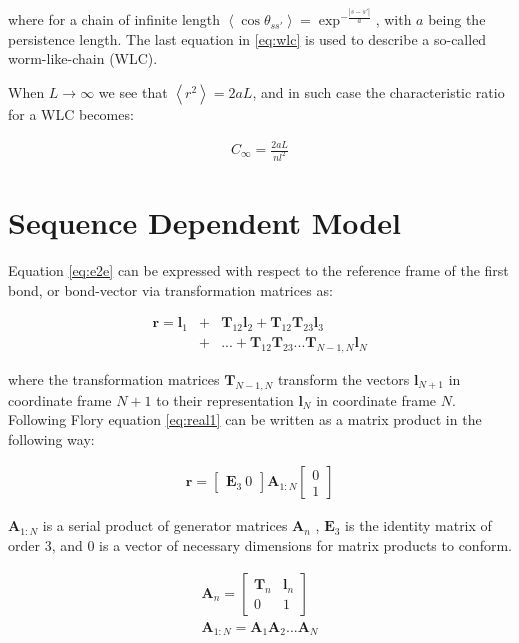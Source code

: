 where  for   a  chain  of  infinite   length  $\left<\cos{\theta_{ss'}}\right>  =
\exp^{-\frac{|s-s'|}{a}}$, with $a$ being the persistence length.  The
last   equation  in   \ref{eq:wlc}   is  used   to   describe  a   so-called
worm-like-chain (WLC).

When $L \to \infty$ we see that $\left<r^{2}\right>=2aL$, and in such
case the characteristic ratio for a WLC becomes:

\begin{gather}
C_{\infty}=\frac{2aL}{nl^{2}}  
\end{gather}  

\section{Sequence Dependent Model}
Equation \ref{eq:e2e} can be expressed with respect to the reference
frame of the first bond, or bond-vector via transformation matrices as:

\begin{eqnarray}
\label{eq:real1}  
\mathbf{r} = \mathbf{l}_{1} & + & \mathbf{T}_{12}\mathbf{l}_{2}
+\mathbf{T}_{12}\mathbf{T}_{23}\mathbf{l}_{3} \nonumber \\
 & + & ... + \mathbf{T}_{12}\mathbf{T}_{23}...\mathbf{T}_{N-1,N} \mathbf{l}_{N}
\end{eqnarray}

where the transformation matrices $\mathbf{T}_{N-1,N}$ transform the
vectors $\mathbf{l}_{N+1}$ in coordinate frame $N+1$ to their
representation $\mathbf{l}_{N}$ in coordinate frame $N$.
Following Flory \cite{flory1969} equation \ref{eq:real1} can be
written as a matrix product in the following way:

\begin{gather}
\mathbf{r}= \begin{bmatrix}\mathbf{E}_{3}~ 0 \end{bmatrix} \mathbf{A}_{1:N}\begin{bmatrix} 0 \\ 1 \end{bmatrix}
\end{gather}

$\mathbf{A}_{1:N}$ is a serial product of generator matrices
$\mathbf{A}_{n}$ \cite{flory1969, maroun1988a, marky1994a},
$\mathbf{E}_{3}$ is the identity matrix of order 3, and $0$ is a
vector of necessary dimensions for matrix products to conform.

\begin{gather}
\mathbf{A}_{n} =
\begin{bmatrix}
\mathbf{T}_{n} & \mathbf{l}_{n} \\
0 & 1
\end{bmatrix}\\
\mathbf{A}_{1:N}=\mathbf{A}_{1}\mathbf{A}_{2}...\mathbf{A}_{N}
\end{gather}

